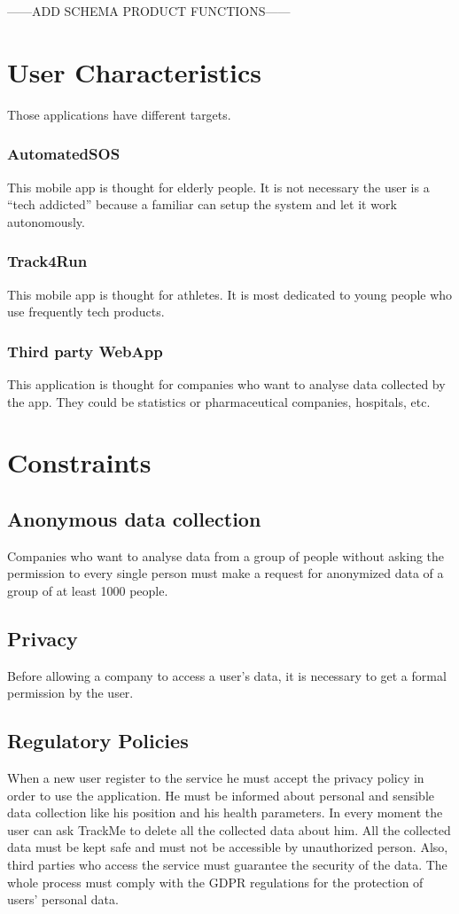 \vspace{1cm}
------ADD SCHEMA PRODUCT FUNCTIONS------

\section{User Characteristics}
Those applications have different targets.

\subsubsection{AutomatedSOS}
This mobile app is thought for elderly people. It is not necessary the user is a “tech addicted” because a familiar can setup the system and let it work autonomously.

\subsubsection{Track4Run}
This mobile app is thought for athletes. It is most dedicated to young people who use frequently tech products.

\subsubsection{Third party WebApp}
This application is thought for companies who want to analyse data collected by the app. They could be statistics or pharmaceutical companies, hospitals, etc.

\section{Constraints}

\subsection{Anonymous data collection}
Companies who want to analyse data from a group of people without asking the permission to every single person must make a request for anonymized data of a group of at least 1000 people.

\subsection{Privacy}
Before allowing a company to access a user’s data, it is necessary to get a formal permission by the user.

\subsection{Regulatory Policies}
When a new user register to the service he must accept the privacy policy in order to use the application.
He must be informed about personal and sensible data collection like his position and his health parameters.
In every moment the user can ask TrackMe to delete all the collected data about him.
All the collected data must be kept safe and must not be accessible by unauthorized person.
Also, third parties who access the service must guarantee the security of the data.
The whole process must comply with the GDPR regulations for the protection of users' personal data.

